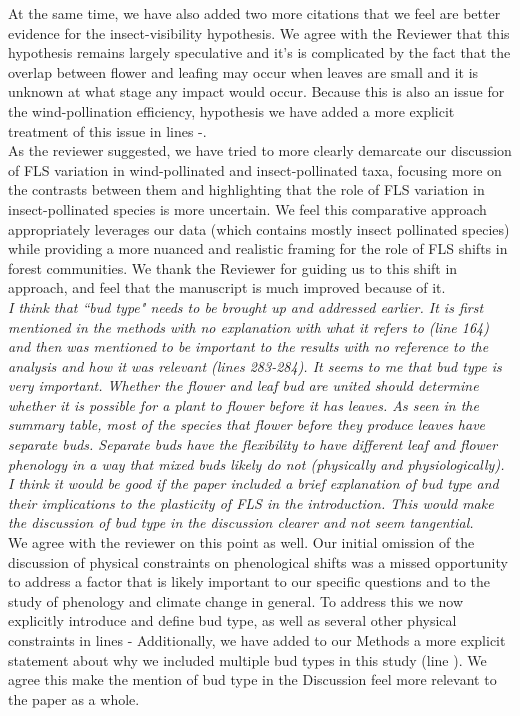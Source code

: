 \documentclass[11pt]{article}
\begin{document}
\noindent At the same time, we have also added two more citations that we feel are better evidence for the insect-visibility hypothesis. We agree with the Reviewer that this hypothesis remains largely speculative and it's is complicated by the fact that the overlap between flower and leafing may occur when leaves are small and it is unknown at what stage any impact would occur. Because this is also an issue for the wind-pollination efficiency, hypothesis we have added a more explicit treatment of this issue in lines -.\\

\noindent As the reviewer suggested, we have tried to more clearly demarcate our discussion of FLS variation in wind-pollinated and insect-pollinated taxa, focusing more on the contrasts between them and highlighting that the role of FLS variation in insect-pollinated species is more uncertain. We feel this comparative approach appropriately leverages our data (which contains mostly insect pollinated species) while providing a more nuanced and realistic framing for the role of FLS shifts in forest communities. We thank the Reviewer for guiding us to this shift in approach, and feel that the manuscript is much improved because of it.\\

\emph{I think that ``bud type" needs to be brought up and addressed earlier. It is first mentioned in the methods with no explanation with what it refers to (line 164) and then was mentioned to be important to the results with no reference to the analysis and how it was relevant (lines 283-284). It seems to me that bud type is very important. Whether the flower and leaf bud are united should determine whether it is possible for a plant to flower before it has leaves.  As seen in the summary table, most of the species that flower before they produce leaves have separate buds. Separate buds have the flexibility to have different leaf and flower phenology in a way that mixed buds likely do not (physically and physiologically). I think it would be good if the paper included a brief explanation of bud type and their implications to the plasticity of FLS in the introduction. This would make the discussion of bud type in the discussion clearer and not seem tangential.}\\

\noindent We agree with the reviewer on this point as well. Our initial omission of the discussion of physical constraints on phenological shifts was a missed opportunity to address a factor that is likely important to our specific questions and to the study of phenology and climate change in general. To address this we now explicitly introduce and define bud type, as well as several other physical constraints in lines - Additionally, we have added to our Methods a more explicit statement about why we included multiple bud types in this study (line ). We agree this make the mention of bud type in the Discussion feel more relevant to the paper as a whole. \\
\end{document}
